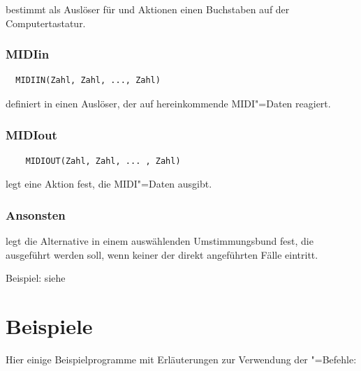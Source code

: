  bestimmt als Auslöser für
 und Aktionen einen Buchstaben auf der
Computertastatur.

\subsection{MIDIin}
\label{sec:SX_MIDIIN}



\begin{verbatim}
  MIDIIN(Zahl, Zahl, ..., Zahl)
\end{verbatim}





 definiert in  einen Auslöser, der 
auf hereinkommende MIDI"=Daten reagiert.

\subsection{MIDIout}
\label{sec:SX_MIDIOUT}



\begin{verbatim}
    MIDIOUT(Zahl, Zahl, ... , Zahl)
\end{verbatim}

 legt eine Aktion fest, die MIDI"=Daten ausgibt.


\subsection{Ansonsten}
\label{sec:SX_ELSE}



 legt die Alternative in einem auswählenden Umstimmungsbund 
fest, die ausgeführt werden soll, wenn keiner der direkt angeführten 
Fälle eintritt.


Beispiel: siehe 


\chapter{Beispiele}
\label{sec:SX_EXAMPLES}
Hier einige Beispielprogramme mit Erläuterungen zur Verwendung 
der \mutabor{}"=Befehle:


